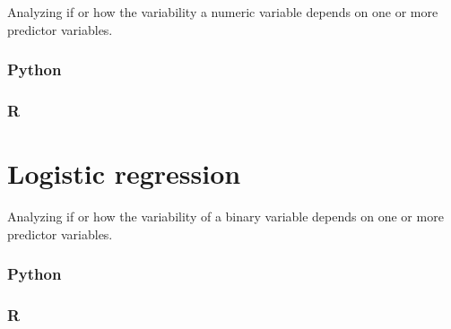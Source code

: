 \documentclass[
]{book}
\begin{document}
Analyzing if or how the variability a numeric variable depends on one or more predictor variables.

\hypertarget{python-47}{%
\subsubsection*{Python}\label{python-47}}

\hypertarget{r-47}{%
\subsubsection*{R}\label{r-47}}

\hypertarget{logistic-regression}{%
\section{Logistic regression}\label{logistic-regression}}

Analyzing if or how the variability of a binary variable depends on one or more predictor variables.

\hypertarget{python-48}{%
\subsubsection*{Python}\label{python-48}}

\hypertarget{r-48}{%
\subsubsection*{R}\label{r-48}}

  
\end{document}
